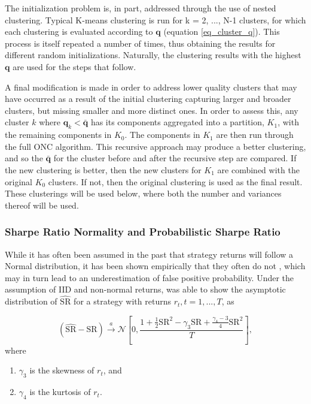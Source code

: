 \documentclass[a4paper,11pt,oneside]{article}
\theoremstyle{plain}
\theoremstyle{definition}
\begin{document}
	The initialization problem is, in part, addressed through the use of nested clustering. Typical K-means clustering is run for k = 2, ..., N-1 clusters, for which each clustering is evaluated according to $\mathbf{q}$ (equation \eqref{eq_cluster_q}). This process is itself repeated a number of times, thus obtaining the results for different random initializations. Naturally, the clustering results with the highest $\mathbf{q}$ are used for the steps that follow. \newline
	
	A final modification is made in order to address lower quality clusters that may have occurred as a result of the initial clustering capturing larger and broader clusters, but missing smaller and more distinct ones. In order to assess this, any cluster $k$ where $\mathbf{q}_k < \mathbf{\bar{q}}$ has its components aggregated into a partition, $K_1$, with the remaining components in $K_0$. The components in $K_1$ are then run through the full ONC algorithm. This recursive approach may produce a better clustering, and so the  $\mathbf{\bar{q}}$  for the cluster before and after the recursive step are compared. If the new clustering is better, then the new clusters for $K_1$ are combined with the original $K_0$ clusters. If not, then the original clustering is used as the final result. These clusterings will be used below, where both the number and variances thereof will be used.
	
	\subsubsection{Sharpe Ratio Normality and Probabilistic Sharpe Ratio}\label{sr_normality}
	
	While it has often been assumed in the past that strategy returns will follow a Normal distribution, it has been shown empirically that they often do not \citep{Brooks}, which may in turn lead to an underestimation of false positive probability. Under the assumption of IID and non-normal returns, \citet{Mertens} was able to show the asymptotic distribution of $\widehat{\mathrm{SR}}$ for a strategy with returns $r_t , t = 1, ..., T$,  as 
	
	\begin{equation}
	(\widehat{\mathrm{SR}}-\mathrm{SR}) \stackrel{a}{\rightarrow} \mathcal{N}\left[0, \frac{1+\frac{1}{2} \mathrm{SR}^{2}-\gamma_{3} \mathrm{SR}+\frac{\gamma_{4}-3}{4}\mathrm{SR}^{2}}{T}\right],
	\end{equation}
	where
	\begin{enumerate}
		\item $\gamma_3$ is the skewness of $r_t$, and 
		\item $\gamma_4$ is the kurtosis of $r_t$.
	\end{enumerate}
\end{document}
